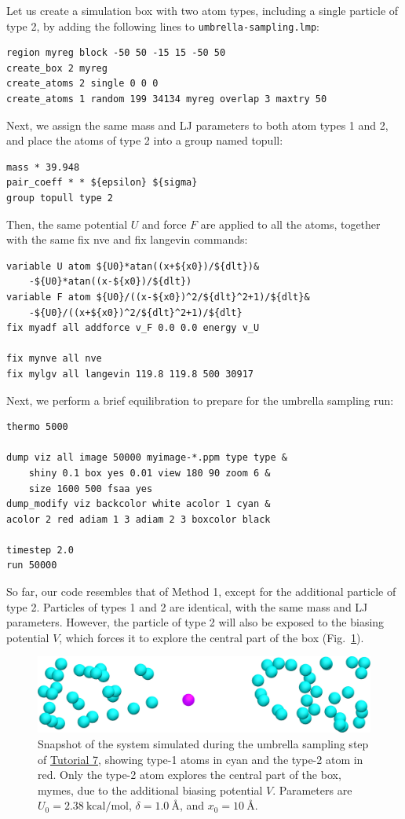\documentclass[9pt,tutorial]{livecoms}
\newcommand{\lmpcmd}[1]{\hspace{0pt}\colorbox{listing}{\textcolor{command}{\small{#1}}}\hspace{0pt}} %
\newcommand{\flecmd}[1]{\textcolor{command}{\texttt{#1}}} %
\begin{document}
Let us create a simulation box with two atom types, including a single particle of type 2,
by adding the following lines to \flecmd{umbrella-sampling.lmp}:
\begin{lstlisting}
region myreg block -50 50 -15 15 -50 50
create_box 2 myreg
create_atoms 2 single 0 0 0
create_atoms 1 random 199 34134 myreg overlap 3 maxtry 50
\end{lstlisting}
Next, we assign the same mass and LJ parameters to both atom types
1 and 2, and place the atoms of type 2 into a group named \lmpcmd{topull}:
\begin{lstlisting}
mass * 39.948
pair_coeff * * ${epsilon} ${sigma}
group topull type 2
\end{lstlisting}
Then, the same potential $U$ and force $F$ are applied to all the atoms,
together with the same \lmpcmd{fix nve} and \lmpcmd{fix langevin} commands:
\begin{lstlisting}
variable U atom ${U0}*atan((x+${x0})/${dlt})&
    -${U0}*atan((x-${x0})/${dlt})
variable F atom ${U0}/((x-${x0})^2/${dlt}^2+1)/${dlt}&
    -${U0}/((x+${x0})^2/${dlt}^2+1)/${dlt}
fix myadf all addforce v_F 0.0 0.0 energy v_U

fix mynve all nve
fix mylgv all langevin 119.8 119.8 500 30917
\end{lstlisting}
Next, we perform a brief equilibration to prepare for the
umbrella sampling run:
\begin{lstlisting}
thermo 5000

dump viz all image 50000 myimage-*.ppm type type &
    shiny 0.1 box yes 0.01 view 180 90 zoom 6 &
    size 1600 500 fsaa yes
dump_modify viz backcolor white acolor 1 cyan &
acolor 2 red adiam 1 3 adiam 2 3 boxcolor black

timestep 2.0
run 50000
\end{lstlisting}

So far, our code resembles that of Method 1, except for the additional particle
of type 2.  Particles of types 1 and 2 are identical, with the same mass
and LJ parameters.  However, the particle of type 2 will also
be exposed to the biasing potential $V$, which forces it to explore the
central part of the box (Fig.~\ref{fig:US-system-biased}).

\begin{figure}
\centering
\includegraphics[width=\linewidth]{US-system-biased}
\caption{Snapshot of the system simulated during the umbrella sampling
step of \hyperref[umbrella-sampling-label]{Tutorial 7}, showing type-1 atoms
in cyan and the type-2 atom in red.  Only the type-2 atom explores the central part of the box,
\lmpcmd{mymes}, due to the additional biasing potential $V$. {\color{blue}Parameters} are
$U_0 = 2.38~\text{kcal/mol}$, $\delta = 1.0~\text{\AA{}}$, and $x_0 = 10~\text{\AA{}}$.}
\label{fig:US-system-biased}
\end{figure}
\end{document}

